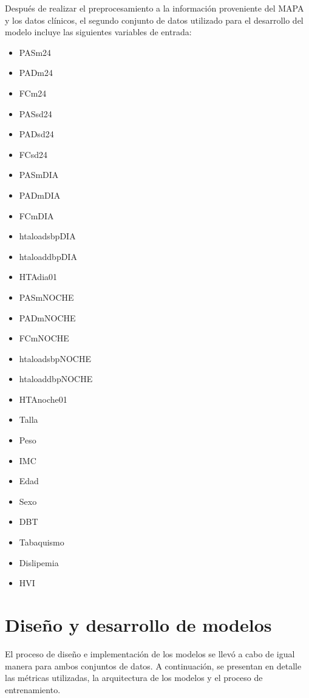 Después de realizar el preprocesamiento a la información proveniente del MAPA y los datos clínicos, el segundo conjunto de 
datos utilizado para el desarrollo del modelo incluye las siguientes variables de entrada:

\begin{itemize}
  \item PASm24	
  \item PADm24
  \item FCm24
  \item PASsd24 
  \item PADsd24
  \item FCsd24
  \item PASmDIA
  \item PADmDIA
  \item FCmDIA
  \item htaloadsbpDIA 
  \item htaloaddbpDIA   
  \item HTAdia01	
  \item PASmNOCHE
  \item PADmNOCHE
  \item FCmNOCHE
  \item htaloadsbpNOCHE
  \item htaloaddbpNOCHE
  \item HTAnoche01
  \item Talla
  \item Peso
  \item IMC
  \item Edad
  \item Sexo
  \item DBT
  \item Tabaquismo
  \item Dislipemia
  \item HVI
\end{itemize}

\section{Diseño y desarrollo de modelos}
El proceso de diseño e implementación de los modelos se llevó a cabo de igual manera para ambos 
conjuntos de datos. A continuación, se presentan en detalle las métricas utilizadas, la 
arquitectura de los modelos y el proceso de entrenamiento.

